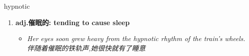 
\begin{frame}
{\huge hypnotic}
\begin{center}
\begin{enumerate}\Large
  \item \textbf{adj.催眠的: tending to cause sleep}
  \begin{itemize}
    \item \em{\Large{Her eyes soon grew heavy from the hypnotic rhythm of the train's wheels.伴随着催眠的铁轨声,她很快就有了睡意}}
  \end{itemize}
\end{enumerate}
\end{center}
\end{frame}
